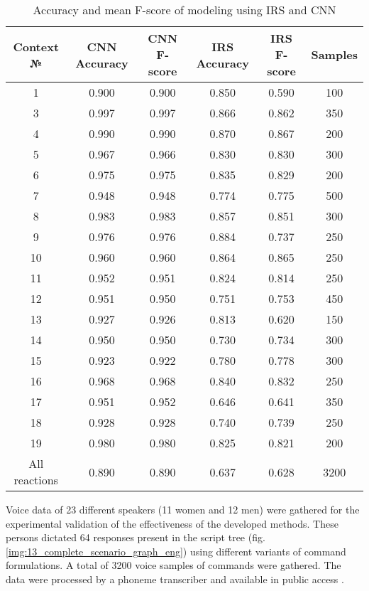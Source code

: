 \documentclass[review,authoryear]{elsarticle}
\begin{document}
\begin{table}
	\caption{Accuracy and mean F-score of modeling using IRS and CNN}%
	\label{tbl:data_total}
	\begin{tabular}{@{}c | c c | c c | c@{}}
		\hline
		Context № & CNN Accuracy & CNN F-score & IRS Accuracy & IRS F-score & Samples \\
		\hline
		1 & 0.900 & 0.900 & 0.850 & 0.590 & 100 \\
		3 & 0.997 & 0.997 & 0.866 & 0.862 & 350 \\
		4 & 0.990 & 0.990 & 0.870 & 0.867 & 200 \\
		5 & 0.967 & 0.966 & 0.830 & 0.830 & 300 \\
		6 & 0.975 & 0.975 & 0.835 & 0.829 & 200 \\
		7 & 0.948 & 0.948 & 0.774 & 0.775 & 500 \\
		8 & 0.983 & 0.983 & 0.857 & 0.851 & 300 \\
		9 & 0.976 & 0.976 & 0.884 & 0.737 & 250 \\
		10 & 0.960 & 0.960 & 0.864 & 0.865 & 250 \\
		11 & 0.952 & 0.951 & 0.824 & 0.814 & 250 \\
		12 & 0.951 & 0.950 & 0.751 & 0.753 & 450 \\
		13 & 0.927 & 0.926 & 0.813 & 0.620 & 150 \\
		14 & 0.950 & 0.950 & 0.730 & 0.734 & 300 \\
		15 & 0.923 & 0.922 & 0.780 & 0.778 & 300 \\
		16 & 0.968 & 0.968 & 0.840 & 0.832 & 250 \\
		17 & 0.951 & 0.952 & 0.646 & 0.641 & 350 \\
		18 & 0.928 & 0.928 & 0.740 & 0.739 & 250 \\
		19 & 0.980 & 0.980 & 0.825 & 0.821 & 200 \\
		All reactions & 0.890 & 0.890 & 0.637 & 0.628 & 3200 \\
		\hline
	\end{tabular}
\end{table}

Voice data of 23 different speakers (11 women and 12 men) were gathered for the experimental validation of the effectiveness of the developed methods. These persons dictated 64 responses present in the script tree (fig. \ref{img:13_complete_scenario_graph_eng}) using different variants of command formulations. A total of 3200 voice samples of commands were gathered. The data were processed by a phoneme transcriber and available in public access \citep{dataset1}. 
\end{document}
